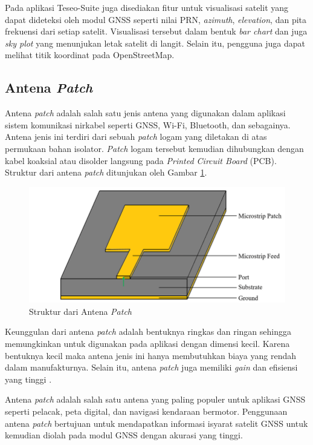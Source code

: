 Pada aplikasi Teseo-Suite juga disediakan fitur untuk visualisasi satelit yang dapat dideteksi oleh modul GNSS seperti nilai PRN, \textit{azimuth}, \textit{elevation}, dan pita frekuensi dari setiap satelit. Visualisasi tersebut dalam bentuk \textit{bar chart} dan juga \textit{sky plot} yang menunjukan letak satelit di langit. Selain itu, pengguna juga dapat melihat titik koordinat pada OpenStreetMap.

\subsection{Antena \textit{Patch}}
Antena \textit{patch} adalah salah satu jenis antena yang digunakan dalam aplikasi sistem komunikasi nirkabel seperti GNSS, Wi-Fi, Bluetooth, dan sebagainya. Antena jenis ini terdiri dari sebuah \textit{patch} logam yang diletakan di atas permukaan bahan isolator. \textit{Patch} logam tersebut kemudian dihubungkan dengan kabel koaksial atau disolder langsung pada \textit{Printed Circuit Board} (PCB). Struktur dari antena \textit{patch} ditunjukan oleh Gambar \ref{Fig: patc-antenna}.

\begin{figure}[ht]
	\centering
	\includegraphics[width=12cm]{contents/chapter-2/patch-antena.jpg}
	\caption{Struktur dari Antena \textit{Patch} \cite{Chowdhury2019}}
	\label{Fig: patc-antenna}
\end{figure}

Keunggulan dari antena \textit{patch} adalah bentuknya ringkas dan ringan sehingga memungkinkan untuk digunakan pada aplikasi dengan dimensi kecil. Karena bentuknya kecil maka antena jenis ini hanya membutuhkan biaya yang rendah dalam manufakturnya. Selain itu, antena \textit{patch} juga memiliki \textit{gain} dan efisiensi yang tinggi \cite{Ding2020}.

Antena \textit{patch} adalah salah satu antena yang paling populer untuk aplikasi GNSS seperti pelacak, peta digital, dan navigasi kendaraan bermotor. Penggunaan antena \textit{patch} bertujuan untuk mendapatkan informasi isyarat satelit GNSS untuk kemudian diolah pada modul GNSS dengan akurasi yang tinggi.

